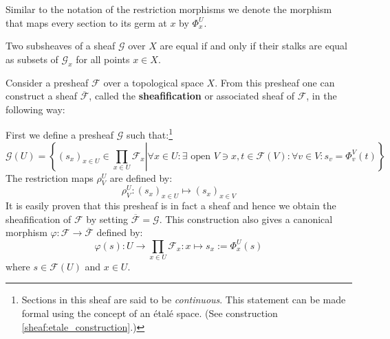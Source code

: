 	\begin{notation}
		Similar to the notation of the restriction morphisms we denote the morphism that maps every section to its germ at $x$ by $\Phi^U_x$.
	\end{notation}
	
	\begin{property}
		Two subsheaves of a sheaf $\mathcal{G}$ over $X$ are equal if and only if their stalks are equal as subsets of $\mathcal{G}_x$ for all points $x\in X$.
	\end{property}
	
	\begin{construct}
		Consider a presheaf $\mathcal{F}$ over a topological space $X$. From this presheaf one can construct a sheaf $\overline{\mathcal{F}}$, called the \textbf{sheafification} or associated sheaf of $\mathcal{F}$, in the following way:
		
		First we define a presheaf $\mathcal{G}$ such that:\footnote{Sections in this sheaf are said to be \textit{continuous}. This statement can be made formal using the concept of an \'etal\'e space. (See construction \ref{sheaf:etale_construction}.)}
		\begin{equation}
			\mathcal{G}(U) = \left\{\left.(s_x)_{x\in U}\in\prod_{x\in U}\mathcal{F}_x\right\vert\forall x\in U: \exists\text{ open }V\ni x, t\in\mathcal{F}(V): \forall v\in V: s_v = \Phi^V_v(t)\right\}
		\end{equation}
		The restriction maps $\rho^U_V$ are defined by:
		\begin{equation}
			\rho^U_V:(s_x)_{x\in U}\mapsto(s_x)_{x\in V}
		\end{equation}
		It is easily proven that this presheaf is in fact a sheaf and hence we obtain the sheafification of $\mathcal{F}$ by setting $\overline{\mathcal{F}} = \mathcal{G}$. This construction also gives a canonical morphism $\varphi:\mathcal{F}\rightarrow\overline{\mathcal{F}}$ defined by:
		\begin{equation}
			\varphi(s):U\rightarrow\prod_{x\in U}\mathcal{F}_x:x \mapsto s_x := \Phi^U_x(s)
		\end{equation}
		where $s\in\mathcal{F}(U)$ and $x\in U$.
	\end{construct}
	
